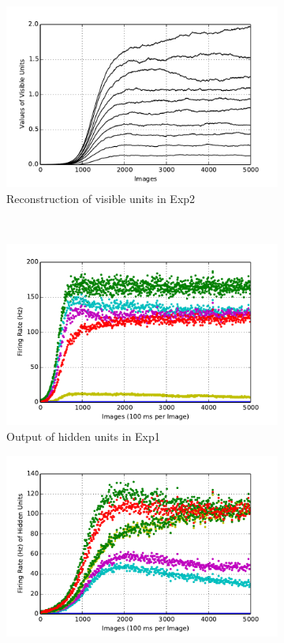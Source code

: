 \begin{figure}
\begin{subfigure}[t]{0.4\textwidth}
			\includegraphics[width=\textwidth]{pics_ae/exp2_recon_nons.pdf}
			\caption{Reconstruction of visible units in Exp2}
		\end{subfigure}\\
		\begin{subfigure}[t]{0.4\textwidth}
			\includegraphics[width=\textwidth]{pics_ae/exp1_hid_s.pdf}
			\caption{Output of hidden units in Exp1}
		\end{subfigure}
		\begin{subfigure}[t]{0.4\textwidth}
			\includegraphics[width=\textwidth]{pics_ae/exp2_hid_s.pdf}

\end{subfigure}
\end{figure}
